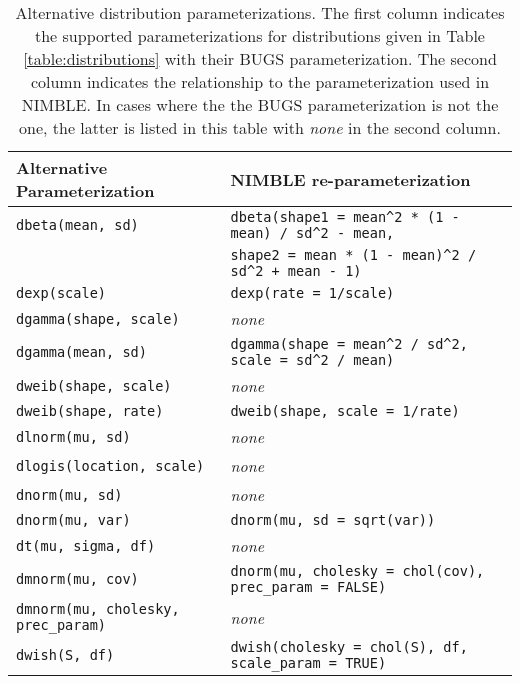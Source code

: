   \begin{center}
    \begin{longtable}{ll}
  \caption{Alternative distribution parameterizations. The first
    column indicates the supported parameterizations for
    distributions given in Table \ref{table:distributions} with their
    BUGS parameterization. The second column indicates the
    relationship to the  parameterization used in
    NIMBLE. In cases where the the BUGS parameterization is not
    the  one, the latter is listed in this table with
    \textit{none} in the second column.} \label{table:distributions-alternates}\\
      \hline
      Alternative Parameterization & NIMBLE re-parameterization \\
      \hline \hline
\endhead
      \texttt{dbeta(mean, sd)} & \verb|dbeta(shape1 = mean^2 * (1 - mean) / sd^2 - mean,| \\
      & \verb|shape2 = mean * (1 - mean)^2 / sd^2 + mean - 1)| \\
      \texttt{dexp(scale)} & \texttt{dexp(rate = 1/scale)} \\
     \texttt{dgamma(shape, scale)} & \textit{none} \\
      \texttt{dgamma(mean, sd)} & \verb|dgamma(shape = mean^2 / sd^2, scale = sd^2 / mean)| \\
     \texttt{dweib(shape, scale)} & \textit{none} \\
     \texttt{dweib(shape, rate)} & \texttt{dweib(shape, scale = 1/rate)} \\
     \texttt{dlnorm(mu, sd)} & \textit{none} \\
     \texttt{dlogis(location, scale)} & \textit{none} \\
     \texttt{dnorm(mu, sd)} & \textit{none} \\
     \texttt{dnorm(mu, var)} & \texttt{dnorm(mu, sd = sqrt(var))} \\
     \texttt{dt(mu, sigma, df)} & \textit{none} \\
     \texttt{dmnorm(mu, cov)} & \texttt{dnorm(mu, cholesky = chol(cov), prec\_param = FALSE)} \\
     \texttt{dmnorm(mu, cholesky, prec\_param)} & \textit{none} \\
     \texttt{dwish(S, df)} & \texttt{dwish(cholesky = chol(S), df, scale\_param = TRUE)}\\ 
     \end{longtable}
  \end{center}
